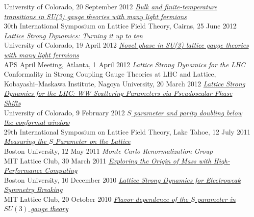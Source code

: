 \begin{spacelist}
\begin{revnumerate}
      University of Colorado, 20 September 2012
    \pagebreakitem
      \textit{\href{http://www.davidschaich.net/talks/lattice12.pdf}{Bulk and finite-temperature transitions in SU(3) gauge theories with many light fermions}} \\
      30th International Symposium on Lattice Field Theory, Cairns, 25 June 2012
    \pagebreakitem
      \textit{\href{http://www.davidschaich.net/talks/LSD10f_1204.pdf}{Lattice Strong Dynamics: Turning it up to ten}} \\
      University of Colorado, 19 April 2012
    \pagebreakitem
      \textit{\href{http://www.davidschaich.net/talks/April12}{Novel phase in SU(3) lattice gauge theories with many light fermions}} \\
      APS April Meeting, Atlanta, 1 April 2012
    \pagebreakitem
      \textit{\href{http://www.davidschaich.net/talks/SCGT12Mini.pdf}{Lattice Strong Dynamics for the LHC}} \\
      Conformality in Strong Coupling Gauge Theories at LHC and Lattice, \\ Kobayashi--Maskawa Institute, Nagoya University, 20 March 2012
    \pagebreakitem
      \textit{\href{http://www.davidschaich.net/talks/1202WW.pdf}{Lattice Strong Dynamics for the LHC: WW Scattering Parameters via Pseudoscalar Phase Shifts}} \\
      University of Colorado, 9 February 2012
    \pagebreakitem
      \textit{\href{http://www.davidschaich.net/talks/Lattice11.pdf}{$S$ parameter and parity doubling below the conformal window}} \\
      29th International Symposium on Lattice Field Theory, Lake Tahoe, 12 July 2011
    \pagebreakitem
      \textit{\href{http://www.davidschaich.net/talks/defense.pdf}{Measuring the $S$ Parameter on the Lattice}} \\
      Boston University, 12 May 2011
    \pagebreakitem
      \textit{Monte Carlo Renormalization Group} \\
      MIT Lattice Club, 30 March 2011
    \pagebreakitem
      \textit{\href{http://www.davidschaich.net/talks/BUseminar.pdf}{Exploring the Origin of Mass with High-Performance Computing}} \\
      Boston University, 10 December 2010
    \pagebreakitem
      \textit{\href{http://www.davidschaich.net/talks/1010MIT.pdf}{Lattice Strong Dynamics for Electroweak Symmetry Breaking}} \\
      MIT Lattice Club, 20 October 2010
    \pagebreakitem
      \textit{\href{http://www.davidschaich.net/talks/Lattice10.pdf}{Flavor dependence of the $S$ parameter in $SU(3)$ gauge theory}} \\

\end{revnumerate}
\end{spacelist}

